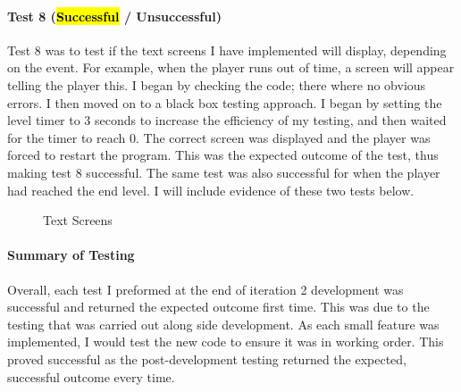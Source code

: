 \documentclass[12pt]{report}
\begin{document}
\paragraph{Test 8 (\hl{Successful} / Unsuccessful)}
Test 8 was to test if the text screens I have implemented will display, depending on the event. For example, when the player runs out of time, a screen will appear telling the player this. I began by checking the code; there where no obvious errors. I then moved on to a black box testing approach. I began by setting the level timer to 3 seconds to increase the efficiency of my testing, and then waited for the timer to reach 0. The correct screen was displayed and the player was forced to restart the program. This was the expected outcome of the test, thus making test 8 successful. The same test was also successful for when the player had reached the end level. I will include evidence of these two tests below. 

 \begin{figure}[H]
    \caption{Text Screens}
\end{figure}

\paragraph{Summary of Testing}
Overall, each test I preformed at the end of iteration 2 development was successful and returned the expected outcome first time. This was due to the testing that was carried out along side development. As each small feature was implemented, I would test the new code to ensure it was in working order. This proved successful as the post-development testing returned the expected, successful outcome every time. 

\pagebreak
\end{document}
